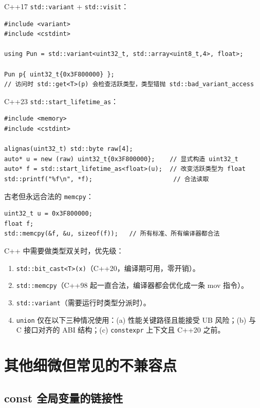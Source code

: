 \documentclass[12pt,a4paper,fontset=fandol]{ctexbook}
\newcommand{\cpplabel}{%
  \tcbox[on line,colback=cppheadbg,colframe=cppheadbg,
    boxrule=0pt,arc=1pt,left=2pt,right=2pt,top=1pt,bottom=1pt,
    colupper=white,fontupper=\scriptsize\bfseries]{C++}}
\newcommand{\cpp}[1]{C++#1}
\newcommand{\kw}[1]{\texttt{#1}}
\begin{document}
\cpplabel{} C++17 \kw{std::variant} + \kw{std::visit}：
\begin{lstlisting}
#include <variant>
#include <cstdint>

using Pun = std::variant<uint32_t, std::array<uint8_t,4>, float>;

Pun p{ uint32_t{0x3F800000} };
// 访问时 std::get<T>(p) 会检查活跃类型，类型错抛 std::bad_variant_access
\end{lstlisting}

\cpplabel{} C++23 \kw{std::start\_lifetime\_as}：
\begin{lstlisting}
#include <memory>
#include <cstdint>

alignas(uint32_t) std::byte raw[4];
auto* u = new (raw) uint32_t{0x3F800000};    // 显式构造 uint32_t
auto* f = std::start_lifetime_as<float>(u);  // 改变活跃类型为 float
std::printf("%f\n", *f);                      // 合法读取
\end{lstlisting}

\cpplabel{} 古老但永远合法的 \kw{memcpy}：
\begin{lstlisting}
uint32_t u = 0x3F800000;
float f;
std::memcpy(&f, &u, sizeof(f));   // 所有标准、所有编译器都合法
\end{lstlisting}

\begin{bestpractice}
\cpp{} 中需要做类型双关时，优先级：
\begin{enumerate}
  \item \kw{std::bit\_cast<T>(x)}（C++20，编译期可用，零开销）。
  \item \kw{std::memcpy}（C++98 起一直合法，编译器都会优化成一条 mov 指令）。
  \item \kw{std::variant}（需要运行时类型分派时）。
  \item \kw{union} 仅在以下三种情况使用：(a) 性能关键路径且能接受 UB 风险；(b) 与 C 接口对齐的 ABI 结构；(c) \kw{constexpr} 上下文且 C++20 之前。
\end{enumerate}
\end{bestpractice}


\chapter{其他细微但常见的不兼容点}

\section{const 全局变量的链接性}
\end{document}
